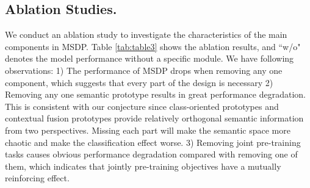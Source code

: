 \documentclass[sigconf,natbib=true,anonymous=False]{acmart}
\begin{document}
\subsection{Ablation Studies. }We conduct an ablation study to investigate the characteristics of the main components in MSDP. Table \ref{tab:table3} shows the ablation results, and “w/o" denotes the model performance without a specific module. We have following observations: 1) The performance of MSDP drops when removing any one component, which suggests that every part of the design is necessary 2) Removing any one semantic prototype results in great performance degradation. This is consistent with our conjecture since class-oriented prototypes and contextual fusion prototypes provide relatively orthogonal semantic information from two perspectives. Missing each part will make the semantic space more chaotic and make the classification effect worse. 3) Removing joint pre-training tasks causes obvious performance degradation compared with removing one of them, which indicates that jointly pre-training objectives have a mutually reinforcing effect.



\begin{table}[!tbp]
\centering
    \caption{The ablation study results (average F1 score
\%) for Few-NERD and CrossNER. }
  \label{tab:table3}\end{table}
\end{document}
